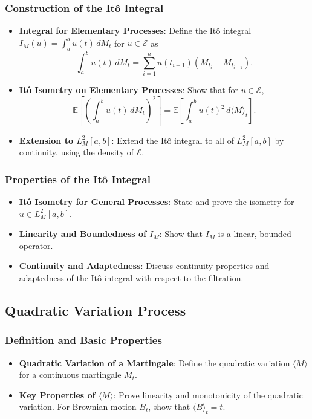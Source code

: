 \subsubsection{Construction of the Itô Integral}
\begin{itemize}
    \item \textbf{Integral for Elementary Processes}: Define the Itô integral $I_M(u) = \int_a^b u(t) \, dM_t$ for $u \in \mathcal{E}$ as
    \[
    \int_a^b u(t) \, dM_t = \sum_{i=1}^n u(t_{i-1})(M_{t_i} - M_{t_{i-1}}).
    \]
    \item \textbf{Itô Isometry on Elementary Processes}: Show that for $u \in \mathcal{E}$,
    \[
    \mathbb{E} \left[ \left( \int_a^b u(t) \, dM_t \right)^2 \right] = \mathbb{E} \left[ \int_a^b u(t)^2 \, d\langle M \rangle_t \right].
    \]
    \item \textbf{Extension to $L^2_M[a,b]$}: Extend the Itô integral to all of $L^2_M[a,b]$ by continuity, using the density of $\mathcal{E}$.
\end{itemize}

\subsubsection{Properties of the Itô Integral}
\begin{itemize}
    \item \textbf{Itô Isometry for General Processes}: State and prove the isometry for $u \in L^2_M[a,b]$.
    \item \textbf{Linearity and Boundedness of $I_M$}: Show that $I_M$ is a linear, bounded operator.
    \item \textbf{Continuity and Adaptedness}: Discuss continuity properties and adaptedness of the Itô integral with respect to the filtration.
\end{itemize}

\subsection{Quadratic Variation Process}

\subsubsection{Definition and Basic Properties}
\begin{itemize}
    \item \textbf{Quadratic Variation of a Martingale}: Define the quadratic variation $\langle M \rangle$ for a continuous martingale $M_t$.
    \item \textbf{Key Properties of $\langle M \rangle$}: Prove linearity and monotonicity of the quadratic variation. For Brownian motion $B_t$, show that $\langle B \rangle_t = t$.
\end{itemize}

